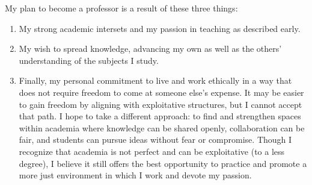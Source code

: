 My plan to become a professor is a result of these three things:
\begin{enumerate}
\item My strong academic intersets and my passion in teaching as described
	early.
\item My wish to spread knowledge, advancing my own as well as the others'
	understanding of the subjects I study.
\item Finally, my personal commitment to live and work ethically in a way that
	does not require freedom to come at someone else’s expense. It may be
	easier to gain freedom by aligning with exploitative structures, but I
	cannot accept that path. I hope to take a different approach: to find and
	strengthen spaces within academia where knowledge can be shared openly,
	collaboration can be fair, and students can pursue ideas without fear or
	compromise. Though I recognize that academia is not perfect and  can be
	exploitative (to a less degree), I believe it still offers the best
	opportunity to practice and promote a more just environment in which I work
	and devote my passion.
\end{enumerate}

